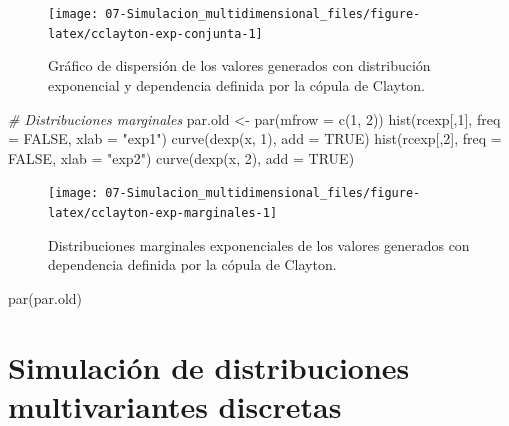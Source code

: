 \documentclass[
]{book}
\newenvironment{Shaded}{\begin{snugshade}}{\end{snugshade}}
\newcommand{\AttributeTok}[1]{\textcolor[rgb]{0.77,0.63,0.00}{#1}}
\newcommand{\CommentTok}[1]{\textcolor[rgb]{0.56,0.35,0.01}{\textit{#1}}}
\newcommand{\ConstantTok}[1]{\textcolor[rgb]{0.00,0.00,0.00}{#1}}
\newcommand{\DecValTok}[1]{\textcolor[rgb]{0.00,0.00,0.81}{#1}}
\newcommand{\FunctionTok}[1]{\textcolor[rgb]{0.00,0.00,0.00}{#1}}
\newcommand{\NormalTok}[1]{#1}
\newcommand{\OtherTok}[1]{\textcolor[rgb]{0.56,0.35,0.01}{#1}}
\newcommand{\StringTok}[1]{\textcolor[rgb]{0.31,0.60,0.02}{#1}}
\theoremstyle{break}
\theoremstyle{definition}
\theoremstyle{definition}
\theoremstyle{definition}
\theoremstyle{definition}
\theoremstyle{remark}
\begin{document}
\begin{enumerate}
\begin{figure}[!htb]
  {\centering \texttt{[image: 07-Simulacion\_multidimensional\_files/figure-latex/cclayton-exp-conjunta-1]} 

  }

  \caption{Gráfico de dispersión de los valores generados con distribución exponencial y dependencia definida por la cópula de Clayton.}\label{fig:cclayton-exp-conjunta}
  \end{figure}

\begin{Shaded}
\begin{Highlighting}[]
\CommentTok{\# Distribuciones marginales}
\NormalTok{par.old }\OtherTok{\textless{}{-}} \FunctionTok{par}\NormalTok{(}\AttributeTok{mfrow =} \FunctionTok{c}\NormalTok{(}\DecValTok{1}\NormalTok{, }\DecValTok{2}\NormalTok{))}
\FunctionTok{hist}\NormalTok{(rcexp[,}\DecValTok{1}\NormalTok{], }\AttributeTok{freq =} \ConstantTok{FALSE}\NormalTok{, }\AttributeTok{xlab =} \StringTok{"exp1"}\NormalTok{)}
\FunctionTok{curve}\NormalTok{(}\FunctionTok{dexp}\NormalTok{(x, }\DecValTok{1}\NormalTok{), }\AttributeTok{add =} \ConstantTok{TRUE}\NormalTok{)}
\FunctionTok{hist}\NormalTok{(rcexp[,}\DecValTok{2}\NormalTok{], }\AttributeTok{freq =} \ConstantTok{FALSE}\NormalTok{, }\AttributeTok{xlab =} \StringTok{"exp2"}\NormalTok{)}
\FunctionTok{curve}\NormalTok{(}\FunctionTok{dexp}\NormalTok{(x, }\DecValTok{2}\NormalTok{), }\AttributeTok{add =} \ConstantTok{TRUE}\NormalTok{)}
\end{Highlighting}
\end{Shaded}

  \begin{figure}[!htb]

  {\centering \texttt{[image: 07-Simulacion\_multidimensional\_files/figure-latex/cclayton-exp-marginales-1]} 

  }

  \caption{Distribuciones marginales exponenciales de los valores generados con dependencia definida por la cópula de Clayton.}\label{fig:cclayton-exp-marginales}
  \end{figure}

\begin{Shaded}
\begin{Highlighting}[]
\FunctionTok{par}\NormalTok{(par.old)}
\end{Highlighting}
\end{Shaded}
\end{enumerate}

\hypertarget{mult-discr}{%
\section{Simulación de distribuciones multivariantes discretas}\label{mult-discr}}
\end{document}
